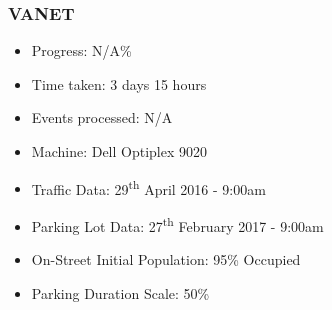 \pagebreak

\subsubsection{VANET}
\begin{itemize}
    \setlength\itemsep{0em}
    \item Progress: N/A\%
    \item Time taken:  3 days 15 hours
    \item Events processed: N/A
    \item Machine: Dell Optiplex 9020
    \item Traffic Data: 29\textsuperscript{th} April 2016 - 9:00am
    \item Parking Lot Data: 27\textsuperscript{th} February 2017 - 9:00am
    \item On-Street Initial Population: 95\% Occupied
    \item Parking Duration Scale: 50\%
\end{itemize}


